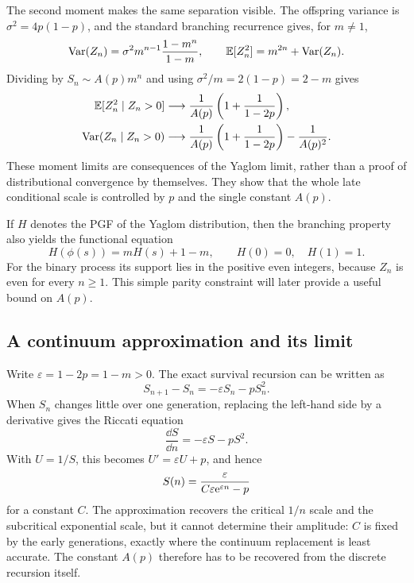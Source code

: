 The second moment makes the same separation visible.  The offspring variance is
\(
  \sigma^2=4p(1-p)
\), and the standard branching recurrence gives, for \(m\neq1\),
\begin{equation}
  \operatorname{Var}(Z_n)
  =\sigma^2m^{n-1}\frac{1-m^n}{1-m},
  \qquad
  \mathbb{E}[Z_n^2]=m^{2n}+\operatorname{Var}(Z_n).
  \label{eq:gw-second-moment}
\end{equation}
Dividing by \(S_n\sim A(p)m^n\) and using
\(
  \sigma^2/m=2(1-p)=2-m
\)
gives
\begin{align}
  \mathbb{E}[Z_n^2\mid Z_n>0]
  &\longrightarrow
  \frac{1}{A(p)}\left(1+\frac{1}{1-2p}\right),
  \label{eq:conditional-second-moment}\\
  \operatorname{Var}(Z_n\mid Z_n>0)
  &\longrightarrow
  \frac{1}{A(p)}\left(1+\frac{1}{1-2p}\right)
  -\frac{1}{A(p)^2}.
  \label{eq:condvar}
\end{align}
These moment limits are consequences of the Yaglom limit, rather than a proof of
distributional convergence by themselves.  They show that the whole late
conditional scale is controlled by \(p\) and the single constant \(A(p)\).

If \(H\) denotes the PGF of the Yaglom distribution, then the branching property
also yields the functional equation
\begin{equation}
  H(\phi(s))=mH(s)+1-m,
  \qquad H(0)=0,\quad H(1)=1.
  \label{eq:yaglom-functional}
\end{equation}
For the binary process its support lies in the positive even integers, because
\(Z_n\) is even for every \(n\geq1\).  This simple parity constraint will later
provide a useful bound on \(A(p)\).

\subsection{A continuum approximation and its limit}
\label{sec:riccati}

Write \(\varepsilon=1-2p=1-m>0\).  The exact survival recursion can be written as
\begin{equation}
  S_{n+1}-S_n=-\varepsilon S_n-pS_n^2.
  \label{eq:Sdiff}
\end{equation}
When \(S_n\) changes little over one generation, replacing the left-hand side by
a derivative gives the Riccati equation
\begin{equation}
  \frac{\dd S}{\dd n}=-\varepsilon S-pS^2.
  \label{eq:riccati}
\end{equation}
With \(U=1/S\), this becomes \(U'=\varepsilon U+p\), and hence
\begin{equation}
  S(n)=\frac{\varepsilon}
  {C\varepsilon\mathrm{e}^{\varepsilon n}-p}
  \label{eq:riccatisol}
\end{equation}
for a constant \(C\).  The approximation recovers the critical \(1/n\) scale and
the subcritical exponential scale, but it cannot determine their amplitude:
\(C\) is fixed by the early generations, exactly where the continuum replacement
is least accurate.  The constant \(A(p)\) therefore has to be recovered from the
discrete recursion itself.

\FloatBarrier

